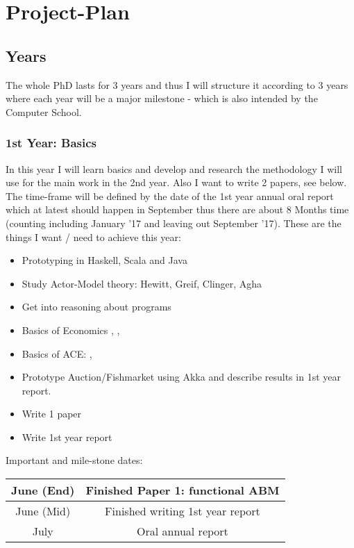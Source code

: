 \section{Project-Plan}

\subsection{Years}
The whole PhD lasts for 3 years and thus I will structure it according to 3 years where each year will be a major milestone - which is also intended by the Computer School.

\subsubsection{1st Year: Basics}
In this year I will learn basics and develop and research the methodology I will use for the main work in the 2nd year. Also I want to write 2 papers, see below. The time-frame will be defined by the date of the 1st year annual oral report which at latest should happen in September thus there are about 8 Months time (counting including January '17 and leaving out September '17). These are the things I want / need to achieve this year:

\begin{itemize}
\item Prototyping in Haskell, Scala and Java
\item Study Actor-Model theory: Hewitt, Greif, Clinger, Agha
\item Get into reasoning about programs
\item Basics of Economics \cite{bowles_understanding_2005}, \cite{LehalleLaruelle2013}, \cite{baker_market_2013}
\item Basics of ACE: \cite{KirmanComplex2010}, \cite{Darley2007}
\item Prototype Auction/Fishmarket using Akka and describe results in 1st year report. 
\item Write 1 paper
\item Write 1st year report
\end{itemize}

Important and mile-stone dates:

\begin{center}
\begin{tabular}{ c|c } 
	June (End) & Finished Paper 1: functional ABM \\ 
	\hline
	June (Mid) & Finished writing 1st year report  \\ 
	\hline
	July & Oral annual report \\
\end{tabular}
\end{center}

